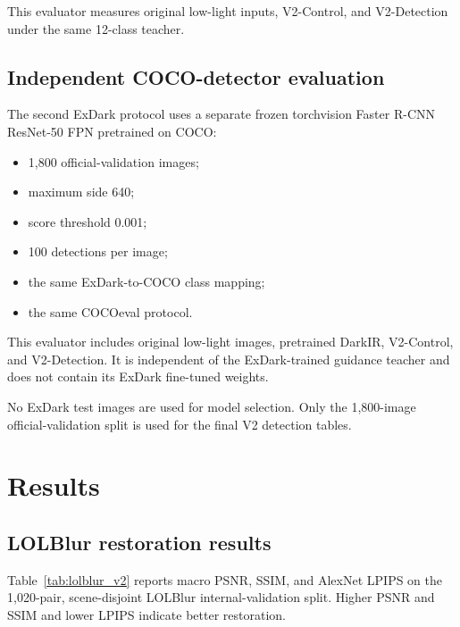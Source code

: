 This evaluator measures original low-light inputs, V2-Control, and
V2-Detection under the same 12-class teacher.

\subsection{Independent COCO-detector evaluation}

The second ExDark protocol uses a separate frozen torchvision Faster R-CNN
ResNet-50 FPN pretrained on COCO:
\begin{itemize}
  \item 1,800 official-validation images;
  \item maximum side 640;
  \item score threshold 0.001;
  \item 100 detections per image;
  \item the same ExDark-to-COCO class mapping;
  \item the same COCOeval protocol.
\end{itemize}

This evaluator includes original low-light images, pretrained DarkIR,
V2-Control, and V2-Detection. It is independent of the ExDark-trained
guidance teacher and does not contain its ExDark fine-tuned weights.

No ExDark test images are used for model selection. Only the 1,800-image
official-validation split is used for the final V2 detection tables.

\section{Results}
\label{sec:results}

\subsection{LOLBlur restoration results}

Table~\ref{tab:lolblur_v2} reports macro PSNR, SSIM, and AlexNet LPIPS
on the 1,020-pair, scene-disjoint LOLBlur internal-validation split.
Higher PSNR and SSIM and lower LPIPS indicate better restoration.

\begin{table}[t]
\centering
\caption{Balanced V2 restoration results on 1,020 LOLBlur internal-validation pairs.}
\label{tab:lolblur_v2}
\end{table}

